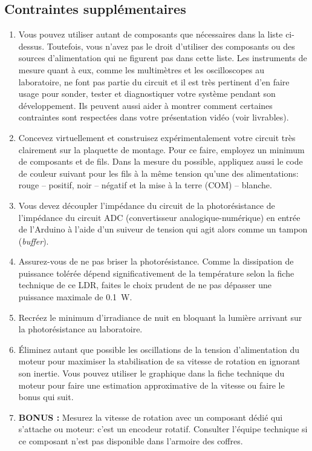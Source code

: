 \documentclass[english,french,12pt]{article}
\begin{document}
\subsection*{Contraintes supplémentaires}
\begin{enumerate}
    \item Vous pouvez utiliser autant de composants que nécessaires dans la liste ci-dessus. Toutefois, vous n’avez pas le droit d’utiliser des composants ou des sources d'alimentation qui ne figurent pas dans cette liste. Les instruments de mesure quant à eux, comme les multimètres et les oscilloscopes au laboratoire, ne font pas partie du circuit et il est très pertinent d'en faire usage pour sonder, tester et diagnostiquer votre système pendant son développement. Ils peuvent aussi aider à montrer comment certaines contraintes sont respectées dans votre présentation vidéo (voir livrables).
    \item Concevez virtuellement et construisez expérimentalement votre circuit très clairement sur la plaquette de montage. Pour ce faire, employez un minimum de composants et de fils. Dans la mesure du possible, appliquez aussi le code de couleur suivant pour les fils à la même tension qu'une des alimentations: rouge -- positif, noir -- négatif et la mise à la terre (COM) -- blanche.
    \item Vous devez découpler l’impédance du circuit de la photorésistance de l’impédance du circuit ADC (convertisseur analogique-numérique) en entrée de l’Arduino à l'aide d'un suiveur de tension qui agit alors comme un tampon (\textit{buffer}).
    \item Assurez-vous de ne pas briser la photorésistance. Comme la dissipation de puissance tolérée dépend significativement de la température selon la fiche technique de ce LDR, faites le choix prudent de ne pas dépasser une puissance maximale de \SI{0.1}{W}.
    \item Recréez le minimum d'irradiance de nuit en bloquant la lumière arrivant sur la photorésistance au laboratoire.
    \item Éliminez autant que possible les oscillations de la tension d'alimentation du moteur pour maximiser la stabilisation de sa vitesse de rotation en ignorant son inertie. Vous pouvez utiliser le graphique dans la fiche technique du moteur pour faire une estimation approximative de la vitesse ou faire le bonus qui suit. 
    \item \textbf{BONUS :} Mesurez la vitesse de rotation avec un composant dédié qui s'attache ou moteur: c'est un encodeur rotatif. Consulter l'équipe technique si ce composant n'est pas disponible dans l'armoire des coffres.
\end{enumerate}
\end{document}
